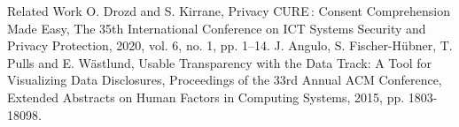 
  Related Work
  O. Drozd and S. Kirrane, Privacy CURE : Consent Comprehension Made Easy, The 35th International Conference on ICT Systems Security and Privacy Protection, 2020, vol. 6, no. 1, pp. 1–14.
  J. Angulo, S. Fischer-Hübner, T. Pulls and E. Wästlund, Usable Transparency with the Data Track: A Tool for Visualizing Data Disclosures, Proceedings of the 33rd Annual ACM Conference, Extended Abstracts on Human Factors in Computing Systems, 2015, pp. 1803-18098.

